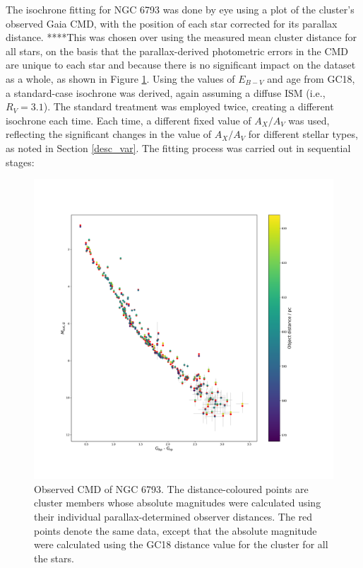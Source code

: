 \documentclass[12pt, a4paper]{report}
\begin{document}
The isochrone fitting for NGC 6793 was done by eye using a plot of the cluster's observed Gaia CMD, with the position of each star corrected for its parallax distance. ****This was chosen over using the measured mean cluster distance for all stars, on the basis that the parallax-derived photometric errors in the CMD are unique to each star and because there is no significant impact on the dataset as a whole, as shown in Figure \ref{indiv_vs_single_distance_check}. Using the values of $E_{B-V}$ and age from GC18, a standard-case isochrone was derived, again assuming a diffuse ISM (i.e., $R_{V} = 3.1$). The standard treatment was employed twice, creating a different isochrone each time. Each time, a different fixed value of $A_{X}/A_{V}$ was used, reflecting the significant changes in the value of $A_{X}/A_{V}$ for different stellar types, as noted in Section \ref{desc_var}. The fitting process was carried out in sequential stages:

\begin{figure}[h!]
\begin{center}
\includegraphics[width=1.0\textwidth]{../NGC_6793_CMD_Myr_single_distance_vizier.pdf}
\caption{Observed CMD of NGC 6793. The distance-coloured points are cluster members whose absolute magnitudes were calculated using their individual parallax-determined observer distances. The red points denote the same data, except that the absolute magnitude were calculated using the GC18 distance value for the cluster for all the stars.}
\label{indiv_vs_single_distance_check}
\end{center}
\end{figure}
\end{document}
